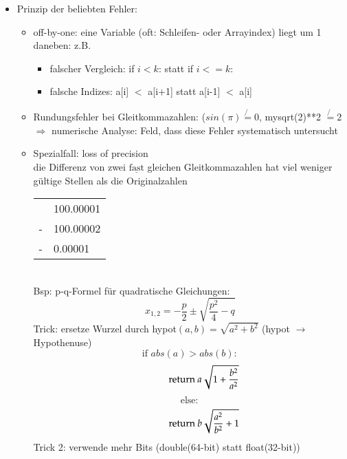 \begin{itemize}
            \item Prinzip der \glqq beliebten Fehler\grqq:
            \begin{itemize}
            \item off-by-one: eine Variable (oft: Schleifen- oder Arrayindex) liegt um 1 daneben: z.B.
            \begin{itemize}
            \item falscher Vergleich: if $i<k$: statt if $i <= k$:
            \item falsche Indizes: a[i] $<$ a[i+1] statt a[i-1] $<$ a[i]
            \end{itemize}
            \item Rundungsfehler bei Gleitkommazahlen: ($sin(\pi)\not{=} 0$, mysqrt(2)**2 $\not{=} 2$\\
            $\Rightarrow$ numerische Analyse: Feld, dass diese Fehler systematisch untersucht
            \item Spezialfall: loss of precision \\
            die Differenz von zwei $\underline{\text{fast}}$ gleichen Gleitkommazahlen hat viel weniger gültige Stellen als die Originalzahlen \\
            \begin{tabular}{L{0.5cm} R{2cm}}
            & 100.00001 \\
            - & 100.00002 \\ \hline
            - & 0.00001 \\
            \end{tabular}\\

            Bsp: p-q-Formel für quadratische Gleichungen:
            \[x_{1,2} = -\frac{p}{2} \pm \sqrt{\frac{p^2}{4} - q} \]
            Trick: ersetze Wurzel durch hypot$(a,b) = \sqrt{a^2 + b^2}$ \hspace*{1cm}(hypot $\rightarrow$ Hypothenuse)\\
            \[ \text{if } abs(a) > abs(b):\]
            \[\hspace*{1cm}\text{return } a \sqrt{1 + \frac{b^2}{a^2}}\]
            \[ \text{else}:\]
            \[\hspace*{1cm}\text{return } b \sqrt{\frac{a^2}{b^2} + 1} \]
            Trick 2: verwende mehr Bits (double(64-bit) statt float(32-bit)) \\


\end{itemize}
\end{itemize}
